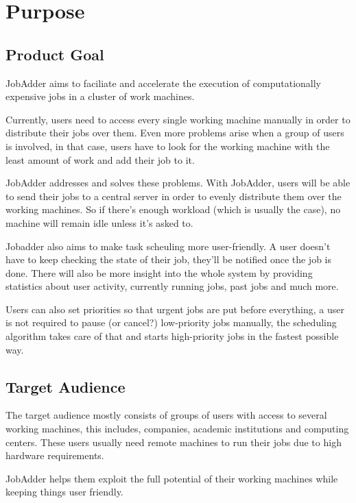 \section{Purpose}
  \subsection{Product Goal}
    JobAdder aims to faciliate and accelerate the execution of computationally expensive jobs in a cluster of work machines.

    Currently, users need to access every single working machine manually in order to distribute their jobs over them. Even more problems arise when a group of users is involved, in that case, users have to look for the working machine with the least amount of work and add their job to it.
    
    JobAdder addresses and solves these problems. With JobAdder, users will be able to send their jobs to a central server in order to evenly distribute them over the working machines. So if there's enough workload (which is usually the case), no machine will remain idle unless it's asked to.

    Jobadder also aims to make task scheuling more user-friendly. A user doesn't have to keep checking the state of their job, they'll be notified once the job is done. There will also be more insight into the whole system by providing statistics about user activity, currently running jobs, past jobs and much more.

    Users can also set priorities so that urgent jobs are put before everything, a user is not required to pause (or cancel?) low-priority jobs manually, the scheduling algorithm takes care of that and starts high-priority jobs in the fastest possible way.

  \subsection{Target Audience}
    The target audience mostly consists of groups of users with access to several working machines, this includes, companies, academic institutions and computing centers. These users usually need remote machines to run their jobs due to high hardware requirements.
    
    JobAdder helps them exploit the full potential of their working machines while keeping things user friendly.